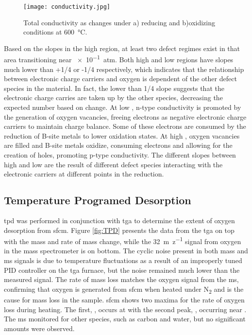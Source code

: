     \begin{figure}
      \texttt{[image: conductivity.jpg]}
      \caption{Total conductivity as  changes under a) reducing and b)oxidizing conditions at \SI{600}{\celsius}.}
      \label{fig:conductivity}
    \end{figure}

    Based on the slopes in the high  region, at least two defect regimes exist in that area transitioning near \SI{e-1}{atm}.
    Both high and low  regions have slopes much lower than +1/4 or -1/4 respectively, which indicates that the relationship between electronic charge carriers and oxygen is dependent of the other defect species in the material.
    In fact, the lower than 1/4 slope suggests that the electronic charge carries are taken up by the other species, decreasing the expected number based on  change.
    At low , n-type conductivity is promoted by the generation of oxygen vacancies, freeing electrons as negative electronic charge carriers to maintain charge balance.
    Some of these electrons are consumed by the reduction of B-site metals to lower oxidation states.
    At high , oxygen vacancies are filled and B-site metals oxidize, consuming electrons and allowing for the creation of holes, promoting p-type conductivity.
    The different slopes between high and low  are the result of different defect species interacting with the electronic carriers at different points in the reduction.

    \subsection{Temperature Programed Desorption}
    \Gls{tpd} was performed in conjunction with \gls{tga} to determine the extent of oxygen desorption from \gls{sfcm}.
    Figure \ref{fig:TPD} presents the data from the \gls{tga} on top with the mass and rate of mass change, while the \SI{32}{m\per z} signal from oxygen in the mass spectrometer is on bottom.
    The cyclic noise present in both mass and \gls{ms} signals is due to temperature fluctuations as a result of an improperly tuned PID controller on the \gls{tga} furnace, but the noise remained much lower than the measured signal.
    The rate of mass loss matches the oxygen signal from the \gls{ms}, confirming that oxygen is generated from \gls{sfcm} when heated under N\textsubscript{2} and is the cause for mass loss in the sample.
    \gls{sfcm} shows two maxima for the rate of oxygen loss during heating.
    The first, \textalpha, occurs at  with the second peak, \textbeta, occurring near .
    The \gls{ms} monitored for other species, such as carbon and water, but no significant amounts were observed.

